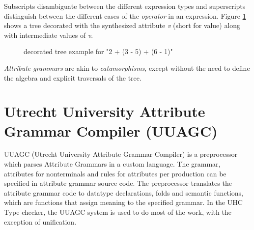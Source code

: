 \documentclass[twoside, titlepage, openright, a4paper]{book}
\newcommand{\Ags}{\emph{Attribute grammars }}
\begin{document}
Subscripts disambiguate between the different expression types and superscripts  distinguish between the different cases of the \emph{operator} in an expression. Figure \ref{fig.example2.decoratedtree} shows a tree decorated with the synthesized attribute \emph{v} (short for value) along with intermediate values of \emph{v}.

\begin{figure}[H]
\centering
{}
\caption{decorated tree example for "2 + (3 - 5) + (6 - 1)"}
\label{fig.example2.decoratedtree}
\end{figure}

\Ags are akin to \emph{catamorphisms}, except without the need to define the algebra and explicit traversals of the tree.

\section{Utrecht University Attribute Grammar Compiler (UUAGC)}
UUAGC (Utrecht University Attribute Grammar Compiler) is a preprocessor which parses Attribute Grammars in a custom language.
The grammar, attributes for nonterminals and rules for attributes per production can be specified in attribute grammar source code. The preprocessor translates the attribute grammar code to datatype declarations, folds and semantic functions, which are functions that assign meaning to the specified grammar. In the UHC Type checker, the UUAGC system is used to do most of the work, with the exception of unification.
\end{document}
